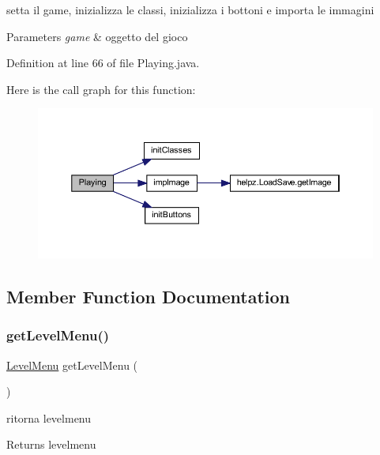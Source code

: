 setta il game, inizializza le classi, inizializza i bottoni e importa le immagini 


\begin{DoxyParams}{Parameters}
{\em game} & oggetto del gioco \\
\hline
\end{DoxyParams}


Definition at line 66 of file Playing.\+java.

Here is the call graph for this function\+:\nopagebreak
\begin{figure}[H]
\begin{center}
\leavevmode
\includegraphics[width=350pt]{classscenes_1_1_playing_af94feaa0eefab45fb50a75c76679c2c7_cgraph}
\end{center}
\end{figure}


\subsection{Member Function Documentation}
\mbox{\label{classscenes_1_1_playing_a0ce048e98f125d557d6b5f68d8993bb5}} 
\subsubsection{\texorpdfstring{get\+Level\+Menu()}{getLevelMenu()}}
{\footnotesize\ttfamily \hyperlink{classui_1_1_level_menu}{Level\+Menu} get\+Level\+Menu (\begin{DoxyParamCaption}{ }\end{DoxyParamCaption})}



ritorna levelmenu 

\begin{DoxyReturn}{Returns}
levelmenu 
\end{DoxyReturn}



